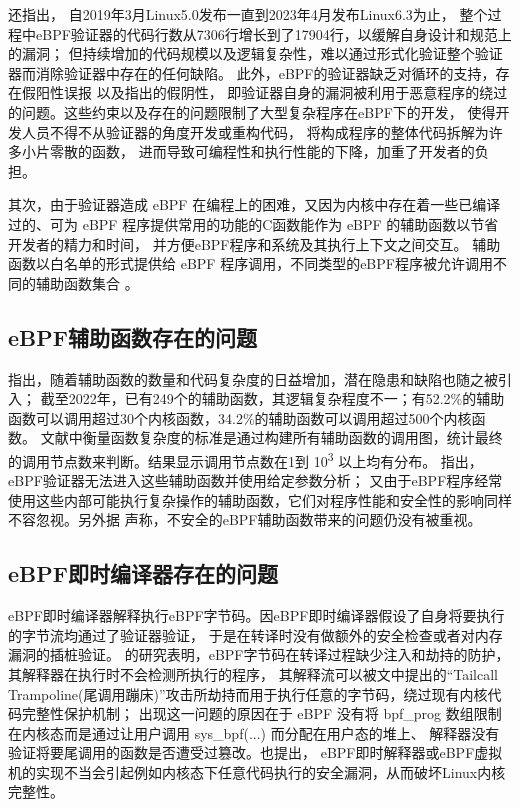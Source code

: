 \documentclass[12pt,a4paper,dvipdfmx]{article}
\begin{document}
\begin{sloppypar}
\begin{CJK*}{UTF8}{song}
	\textcite[2]{limUnleashingUnprivilegedEBPF2023}还指出，
	自2019年3月Linux5.0发布一直到2023年4月发布Linux6.3为止，
	整个过程中eBPF验证器的代码行数从7306行增长到了17904行，以缓解自身设计和规范上的漏洞；
	但持续增加的代码规模以及逻辑复杂性，难以通过形式化验证整个验证器而消除验证器中存在的任何缺陷。
	此外，eBPF的验证器缺乏对循环的支持\cite{gershuniSimplePreciseStatic2019}，存在假阳性误报
	\cite{hive,gershuniSimplePreciseStatic2019}以及\textcite[2,5,6]{PKSeBPFIsolation}指出的假阴性，
	即验证器自身的漏洞被利用于恶意程序的绕过的问题。这些约束以及存在的问题限制了大型复杂程序在eBPF下的开发，
	使得开发人员不得不从验证器的角度开发\cite{PKSeBPFIsolation}或重构\cite{HaoValidating}代码，
	将构成程序的整体代码拆解为许多小片零散的函数\cite{AcceleratingMemcachedUsingSafeinKernCache}，
	进而导致可编程性和执行性能的下降\cite{kuoVerifiedProgramsCan2022}，加重了开发者的负担。

	其次，由于验证器造成 eBPF 在编程上的困难，又因为内核中存在着一些已编译过的、可为 eBPF
	程序提供常用的功能的C函数能作为 eBPF 的辅助函数以节省开发者的精力和时间\cite{FuzzOnEBPF}，
	并方便eBPF程序和系统及其执行上下文之间交互\cite{gbadamosiEBPFRuntimeLinux2024}。
	辅助函数以白名单的形式提供给 eBPF 程序调用，不同类型的eBPF程序被允许调用不同的辅助函数集合
	\cite{isovalentEBPFDocs2024, FuzzOnEBPF}。
	\subsection{eBPF辅助函数存在的问题}
	\textcite{jiaKernelExtensionVerification2023}指出，随着辅助函数的数量和代码复杂度的日益增加，潜在隐患和缺陷也随之被引入；
	截至2022年，已有249个的辅助函数，其逻辑复杂程度不一；有52.2\%的辅助函数可以调用超过30个内核函数，34.2\%的辅助函数可以调用超过500个内核函数。
	文献中衡量函数复杂度的标准是通过构建所有辅助函数的调用图，统计最终的调用节点数来判断。结果显示调用节点数在1到
	10\textsuperscript{3} 以上均有分布。
	\textcite[3]{sahuEnablingBPFRuntime2023}指出，eBPF验证器无法进入这些辅助函数并使用给定参数分析；
	又由于eBPF程序经常使用这些内部可能执行复杂操作的辅助函数，它们对程序性能和安全性的影响同样不容忽视。另外据
	\textcite[4]{jiaKernelExtensionVerification2023}声称，不安全的eBPF辅助函数带来的问题仍没有被重视。
	\subsection{eBPF即时编译器存在的问题}
	eBPF即时编译器解释执行eBPF字节码。因eBPF即时编译器假设了自身将要执行的字节流均通过了验证器验证，
	于是在转译时没有做额外的安全检查\cite{gershuniSimplePreciseStatic2019}或者对内存漏洞的插桩验证\cite[5]{sunFindingCorrectnessBugs2024}。
	\textcite{interpreterhijeck}的研究表明，eBPF字节码在转译过程缺少注入和劫持的防护，其解释器在执行时不会检测所执行的程序，
	其解释流可以被文中提出的“Tailcall Trampoline(尾调用蹦床)”攻击所劫持而用于执行任意的字节码，绕过现有内核代码完整性保护机制；
	出现这一问题的原因在于 eBPF 没有将 bpf\_prog 数组限制在内核态而是通过让用户调用 sys\_bpf(...) 而分配在用户态的堆上、
	解释器没有验证将要尾调用的函数是否遭受过篡改。\textcite[2]{ProofofJITeBPFvmForIoT}也提出，
	eBPF即时解释器或eBPF虚拟机的实现不当会引起例如内核态下任意代码执行的安全漏洞，从而破坏Linux内核完整性。


\end{CJK*}
\end{sloppypar}
\end{document}
